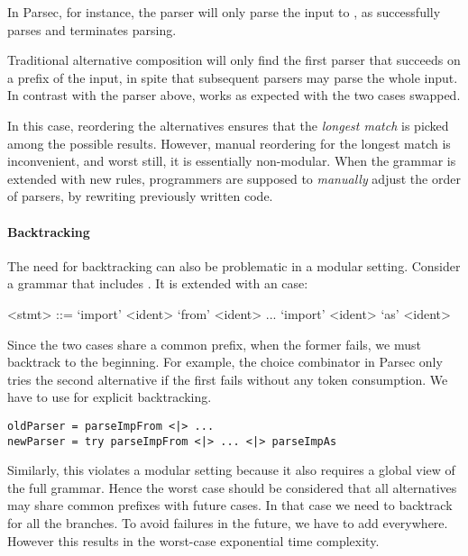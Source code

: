 In Parsec, for instance, the parser  will only parse the input  to , as  successfully parses 
and terminates parsing.

Traditional alternative composition will only find the first parser that succeeds on a prefix of the input,
in spite that subsequent parsers may parse the whole input. In contrast with the parser above,  works as expected with the two cases swapped.

In this case, reordering the alternatives ensures that
the \emph{longest match} is picked among the possible results. However, manual reordering for the longest match is inconvenient, and worst still, it is essentially non-modular. When the grammar is extended with new rules, programmers are supposed to \emph{manually} adjust
the order of parsers, by rewriting previously written code.

\paragraph{Backtracking} The need for backtracking can also be problematic
in a modular setting. Consider a grammar that includes .
It is extended with an  case:

\setlength{\grammarindent}{5em}
\begin{grammar}
<stmt> ::= `import' <ident> `from' <ident>
    \alt ...
    \alt `import' <ident> `as' <ident>
\end{grammar}
Since the two cases share a common prefix, when the former fails, we must backtrack to the beginning.
For example, the choice combinator in Parsec only tries the second alternative if the first fails
without any token consumption. We have to use  for explicit backtracking.

\begin{lstlisting}[language=PlainCode]
oldParser = parseImpFrom <|> ...
newParser = try parseImpFrom <|> ... <|> parseImpAs
\end{lstlisting}

Similarly, this violates a modular setting because it also requires a global view of the full grammar.
Hence the worst case should be considered that all alternatives may share common prefixes with future cases. In that case we need to backtrack for all the branches. To avoid failures in the future, we have to add  everywhere. However this results in the worst-case exponential time
complexity.

